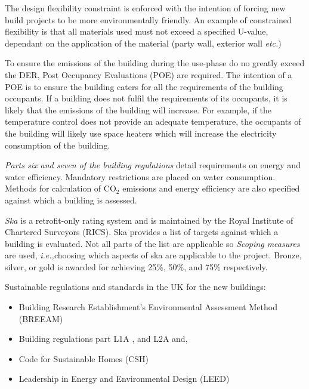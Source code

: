 \documentclass[a4paper,fleqn]{article}
\makeatletter
\newcommand{\ie}{\emph{i.e.,\@\xspace}}
\newcommand{\etc}{\emph{etc.\@\xspace}}
\renewcommand{\section}{\newpage\stdsection}
\renewcommand{\cite}{\citep}
\makeatother
\begin{document}
The design flexibility constraint is enforced with the intention of forcing new build projects to be more 
environmentally friendly. An example of constrained flexibility is that all materials used must 
not exceed a specified U-value, dependant on the application of the material (party wall, exterior wall 
\etc)

To ensure the emissions of the building during the use-phase do no greatly exceed the DER, Post Occupancy 
Evaluations (POE) are required. The intention of a POE is to ensure the building caters for all the requirements 
of the building occupants. If a building does not fulfil the requirements of its occupants, it is likely that 
the emissions of the building will increase. For example, if the temperature control does not provide an adequate 
temperature, the occupants of the building will likely use space heaters which will increase the electricity 
consumption of the building.

\emph{Parts six and seven of the building regulations} detail requirements on energy and water efficiency. Mandatory 
restrictions are placed on water consumption. Methods for calculation of CO$_2$ emissions and energy efficiency are 
also specified against which a building is assessed.

\emph{Ska} is a retrofit-only rating system and is maintained by the Royal Institute of Chartered Surveyors (RICS). 
Ska provides a list of targets against which a building is evaluated. Not all parts of the list are applicable so 
\emph{Scoping measures} are used, \ie choosing which aspects of ska are applicable to the project. Bronze, silver, 
or gold is awarded for achieving 25\%, 50\%, and 75\% respectively.


\section*{b: the new-build development}

Sustainable regulations and standards in the UK for the new buildings:
\begin{itemize}
	\item Building Research Establishment's Environmental Assessment Method (BREEAM) \cite{BRE2012}
	\item Building regulations part L1A \cite{Communities&LocalGovernment2010}, and  
		L2A \cite{Communities&LocalGovernment2010b} and, 
	\item Code for Sustainable Homes (CSH) \cite{Communities&LocalGovernment2010d}
	\item Leadership in Energy and Environmental Design (LEED)
\end{itemize}
\end{document}
